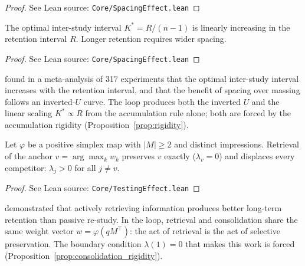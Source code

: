 \begin{proof}
\leanok
{}
See Lean source: \texttt{Core/SpacingEffect.lean}
\end{proof}

\begin{corollary}
\label{cor:cepeda}
\leanok
{}
The optimal inter-study interval $K^* = R/(n-1)$ is linearly increasing in the retention interval $R$.  Longer retention requires wider spacing.
\end{corollary}

\begin{proof}
\leanok
{}
See Lean source: \texttt{Core/SpacingEffect.lean}
\end{proof}

\begin{remark}
\label{rem:spacing}
\leanok
{}
\citet{cepeda2006} found in a meta-analysis of 317 experiments that the optimal inter-study interval increases with the retention interval, and that the benefit of spacing over massing follows an inverted-$U$ curve.  The loop produces both the inverted $U$ and the linear scaling $K^* \propto R$ from the accumulation rule alone; both are forced by the accumulation rigidity (Proposition~\ref{prop:rigidity}).
\end{remark}

\begin{corollary}
\label{cor:testing}
\leanok
{}
Let $\varphi$ be a positive simplex map with $|M| \geq 2$ and distinct impressions.  Retrieval of the anchor $v = \arg\max_k w_k$ preserves $v$ exactly ($\lambda_v = 0$) and displaces every competitor: $\lambda_j > 0$ for all $j \neq v$.
\end{corollary}

\begin{proof}
\leanok
{}
See Lean source: \texttt{Core/TestingEffect.lean}
\end{proof}

\begin{remark}
\label{rem:testing}
\leanok
{}
\citet{roediger2006} demonstrated that actively retrieving information produces better long-term retention than passive re-study.  In the loop, retrieval and consolidation share the same weight vector $w = \varphi(qM^\top)$: the act of retrieval is the act of selective preservation.  The boundary condition $\lambda(1) = 0$ that makes this work is forced (Proposition~\ref{prop:consolidation_rigidity}).
\end{remark}

